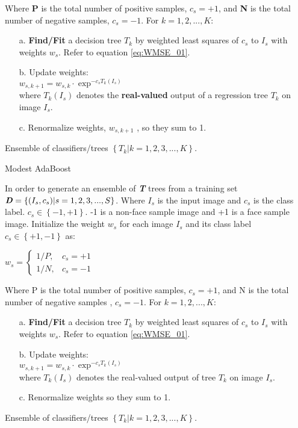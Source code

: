 \begin{compactitem}
\begin{algorithm}[htb]
\begin{algorithmic}[1]
		Where \textbf{P} is the total number of positive samples, $c_s=+1$, and \textbf{N} is the total number
		of negative samples, $c_s=-1$.
    \State For $k = 1,2,...,K:$
    \begin{itemize}
	\item[a.]{\textbf{Find/Fit} a decision tree $T_k$ by weighted least squares of $c_s$ to $I_s$ with
	weights $w_s$}. Refer to equation \eqref{eq:WMSE_01}.
	\item[b.]{Update weights:}\\
		$w_{s,k+1} = w_{s,k} \cdot \exp^{-c_s T_k(I_s)}$\\
		where $T_k(I_s)$ denotes the \textbf{real-valued} output of a regression tree $T_k$ on image $I_s$.
	\item[c.]{Renormalize weights, $w_{s,k+1}$ , so they sum to 1.}
	\end{itemize}
    \Ensure
      Ensemble of classifiers/trees $\left\{ { T_k | k=1,2,3,...,K}\right\}$.
  \end{algorithmic}
\end{algorithm}

\begin{algorithm}[htb]
  \caption{ Modest AdaBoost}\cite{GML327}
  \label{alg:ModestAdaBoost}
  \begin{algorithmic}[1]
    \Require
	In order to generate an ensemble of \textbf{\textit{T}} trees from a training set
	$\textbf{\textit{D}}=\left\{ { (I_s,c_s) | s=1,2,3,...,S}\right\}$. Where $I_s$ is
	the input image and $c_s$ is the class label. $c_s \in \left\{{-1,+1 } \right\}$.
	-1 is a non-face sample image and +1 is a face sample image.
    \State Initialize the weight $w_s$ for each image $I_s$ and its class label $c_s \in
    	\left\{ {+1,-1}\right\}$ as:

    $w_s=
	\begin{cases}
    1/P,	& c_s = +1 \\
    1/N,    & c_s = -1
	\end{cases}$

		Where P is the total number of positive samples, $c_s=+1$,
		and N is the total number of negative samples , $c_s=-1$.
    \State For $k = 1,2,...,K:$
    \begin{itemize}
	\item[a.]{\textbf{Find/Fit} a decision tree $T_k$ by weighted least squares of $c_s$ to $I_s$ with
	weights $w_s$}. Refer to equation \eqref{eq:WMSE_01}.
	\item[b.]{Update weights:}\\
		$w_{s,k+1} = w_{s,k} \cdot \exp^{-c_s T_k(I_s)}$\\
		where $T_k(I_s)$ denotes the real-valued output of tree $T_k$ on image $I_s$.
	\item[c.]{Renormalize weights so they sum to 1.}
	\end{itemize}
    \Ensure
      Ensemble of classifiers/trees $\left\{ { T_k | k=1,2,3,...,K}\right\}$.
  \end{algorithmic}
\end{algorithm}


\end{compactitem}
